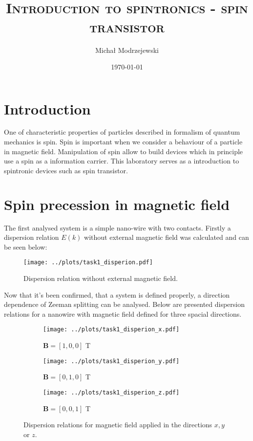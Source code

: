 \documentclass[12pt,a4]{article}
\title{\textsc{Introduction to spintronics - spin transistor}}
\author{Michał Modrzejewski}
\date{\today}
\begin{document}
	
\maketitle

\section*{Introduction}

One of characteristic properties of particles described in formalism of quantum mechanics is spin. Spin is important when we consider a behaviour of a particle in magnetic field. Manipulation of spin allow to build devices which in principle use a spin as a information carrier. This laboratory serves as a introduction to spintronic devices such as spin transistor.

\section*{Spin precession in magnetic field}

The first analysed system is a simple nano-wire with two contacts. Firstly a dispersion relation $E(k)$ without external magnetic field was calculated and can be seen below:

\begin{figure}[H]
	\centering
	\texttt{[image: ../plots/task1\_disperion.pdf]}
	\caption{Dispersion relation without external magnetic field.}
\end{figure}

Now that it's been confirmed, that a system is defined properly, a direction dependence of Zeeman splitting can be analysed. Below are presented dispersion relations for a nanowire with magnetic field defined for three spacial directions.

\begin{figure}[H]
	\begin{subfigure}{.33\textwidth}
		\texttt{[image: ../plots/task1\_disperion\_x.pdf]}
		\caption{$\mathbf{B} = [1,0,0]$ T}
	\end{subfigure}
	\begin{subfigure}{.33\textwidth}
		\texttt{[image: ../plots/task1\_disperion\_y.pdf]}
		\caption{$\mathbf{B} = [0,1,0]$ T}
	\end{subfigure}
	\begin{subfigure}{.33\textwidth}
		\texttt{[image: ../plots/task1\_disperion\_z.pdf]}
		\caption{$\mathbf{B} = [0,0,1]$ T}
	\end{subfigure}
	\caption{Dispersion relations for magnetic field applied in the directions $x,y$ or $z$.}
\end{figure}
\end{document}
